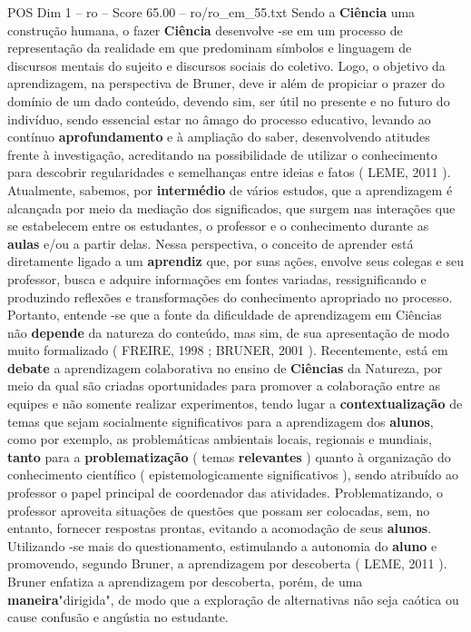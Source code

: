\begin{textsample}{POS Dim 1 – ro – Score 65.00 – ro/ro\_em\_55.txt}
Sendo a \textbf{Ciência} uma construção humana, o fazer \textbf{Ciência} desenvolve -se em um processo de representação da realidade em que predominam símbolos e linguagem de discursos mentais do sujeito e discursos sociais do coletivo.
Logo, o objetivo da aprendizagem, na perspectiva de Bruner, deve ir além de propiciar o prazer do domínio de um dado conteúdo, devendo sim, ser útil no presente e no futuro do indivíduo, sendo essencial estar no âmago do processo educativo, levando ao contínuo \textbf{aprofundamento} e à ampliação do saber, desenvolvendo atitudes frente à investigação, acreditando na possibilidade de utilizar o conhecimento para descobrir regularidades e semelhanças entre ideias e fatos ( LEME, 2011 ).
Atualmente, sabemos, por \textbf{intermédio} de vários estudos, que a aprendizagem é alcançada por meio da mediação dos significados, que surgem nas interações que se estabelecem entre os estudantes, o professor e o conhecimento durante as \textbf{aulas} e/ou a partir delas.
Nessa perspectiva, o conceito de aprender está diretamente ligado a um \textbf{aprendiz} que, por suas ações, envolve seus colegas e seu professor, busca e adquire informações em fontes variadas, ressignificando e produzindo reflexões e transformações do conhecimento apropriado no processo.
Portanto, entende -se que a fonte da dificuldade de aprendizagem em Ciências não \textbf{depende} da natureza do conteúdo, mas sim, de sua apresentação de modo muito formalizado ( FREIRE, 1998 ; BRUNER, 2001 ).
Recentemente, está em \textbf{debate} a aprendizagem colaborativa no ensino de \textbf{Ciências} da Natureza, por meio da qual são criadas oportunidades para promover a colaboração entre as equipes e não somente realizar experimentos, tendo lugar a \textbf{contextualização} de temas que sejam socialmente significativos para a aprendizagem dos \textbf{alunos}, como por exemplo, as problemáticas ambientais locais, regionais e mundiais, \textbf{tanto} para a \textbf{problematização} ( temas \textbf{relevantes} ) quanto à organização do conhecimento científico ( epistemologicamente significativos ), sendo atribuído ao professor o papel principal de coordenador das atividades.
Problematizando, o professor aproveita situações de questões que possam ser colocadas, sem, no entanto, fornecer respostas prontas, evitando a acomodação de seus \textbf{alunos}.
Utilizando -se mais do questionamento, estimulando a autonomia do \textbf{aluno} e promovendo, segundo Bruner, a aprendizagem por descoberta ( LEME, 2011 ).
Bruner enfatiza a aprendizagem por descoberta, porém, de uma \textbf{maneira}"dirigida", de modo que a exploração de alternativas não seja caótica ou cause confusão e angústia no estudante.

\end{textsample}

